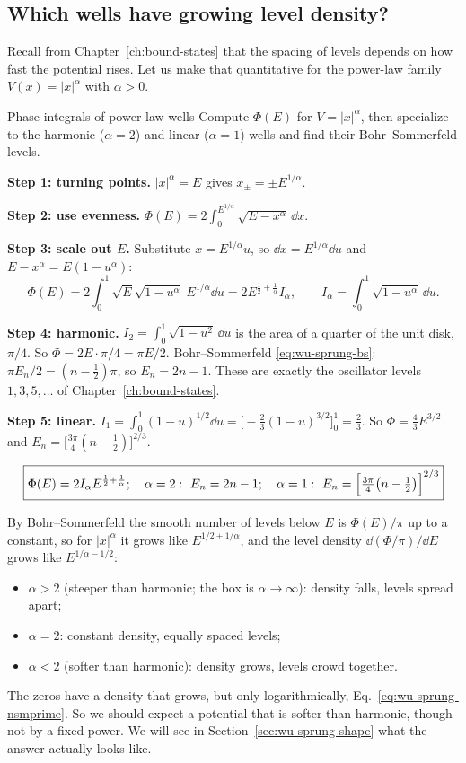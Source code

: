 \subsection{Which wells have growing level density?}

Recall from Chapter~\ref{ch:bound-states} that the spacing of levels depends on how fast the potential rises. Let us make that quantitative for the power-law family $V(x)=|x|^\alpha$ with $\alpha>0$.

\begin{sample}{Phase integrals of power-law wells}
Compute $\Phi(E)$ for $V=|x|^\alpha$, then specialize to the harmonic ($\alpha=2$) and linear ($\alpha=1$) wells and find their Bohr--Sommerfeld levels.

\textbf{Step 1: turning points.} $|x|^\alpha=E$ gives $x_\pm=\pm E^{1/\alpha}$.

\textbf{Step 2: use evenness.} $\Phi(E)=2\int_0^{E^{1/\alpha}}\sqrt{E-x^\alpha}\,\dd x$.

\textbf{Step 3: scale out $E$.} Substitute $x=E^{1/\alpha}u$, so $\dd x=E^{1/\alpha}\dd u$ and $E-x^\alpha=E(1-u^\alpha)$:
\[
\Phi(E)=2\int_0^1\sqrt{E}\sqrt{1-u^\alpha}\;E^{1/\alpha}\dd u=2E^{\frac12+\frac1\alpha}I_\alpha,\qquad I_\alpha=\int_0^1\sqrt{1-u^\alpha}\,\dd u .
\]

\textbf{Step 4: harmonic.} $I_2=\int_0^1\sqrt{1-u^2}\,\dd u$ is the area of a quarter of the unit disk, $\pi/4$. So $\Phi=2E\cdot\pi/4=\pi E/2$. Bohr--Sommerfeld \eqref{eq:wu-sprung-bs}: $\pi E_n/2=(n-\tfrac12)\pi$, so $E_n=2n-1$. These are exactly the oscillator levels $1,3,5,\dots$ of Chapter~\ref{ch:bound-states}.

\textbf{Step 5: linear.} $I_1=\int_0^1(1-u)^{1/2}\dd u=\bigl[-\tfrac23(1-u)^{3/2}\bigr]_0^1=\tfrac23$. So $\Phi=\tfrac43E^{3/2}$ and $E_n=\bigl[\tfrac{3\pi}{4}(n-\tfrac12)\bigr]^{2/3}$.

\[
\boxed{\Phi(E)=2I_\alpha E^{\frac12+\frac1\alpha};\quad \alpha=2:\ E_n=2n-1;\quad \alpha=1:\ E_n=\Bigl[\tfrac{3\pi}{4}\bigl(n-\tfrac12\bigr)\Bigr]^{2/3}}
\]
\end{sample}

By Bohr--Sommerfeld the smooth number of levels below $E$ is $\Phi(E)/\pi$ up to a constant, so for $|x|^\alpha$ it grows like $E^{1/2+1/\alpha}$, and the level density $\dd(\Phi/\pi)/\dd E$ grows like $E^{1/\alpha-1/2}$:
\begin{itemize}
\item $\alpha>2$ (steeper than harmonic; the box is $\alpha\to\infty$): density falls, levels spread apart;
\item $\alpha=2$: constant density, equally spaced levels;
\item $\alpha<2$ (softer than harmonic): density grows, levels crowd together.
\end{itemize}
The zeros have a density that grows, but only logarithmically, Eq.~\eqref{eq:wu-sprung-nsmprime}. So we should expect a potential that is softer than harmonic, though not by a fixed power. We will see in Section~\ref{sec:wu-sprung-shape} what the answer actually looks like.

